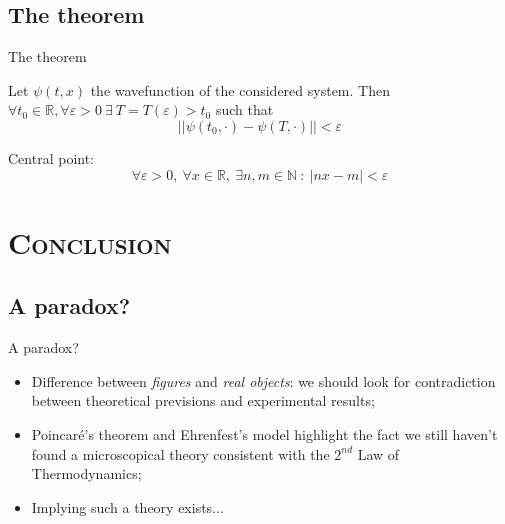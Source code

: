 \documentclass[xcolor=x11names, compress]{beamer}
\renewcommand{\(}{\begin{columns}}
\renewcommand{\)}{\end{columns}}
\newcommand{\<}[1]{\begin{column}{#1}}
\renewcommand{\>}{\end{column}}
\theoremstyle{definition}
\theoremstyle{plain}
\begin{document}
\subsection{The theorem}
\begin{frame}{The theorem}
\large{
\begin{theorem}
Let $\psi(t, x)$ the wavefunction of the considered system.\newline
Then $\forall t_0\in\mathbb R, \forall \varepsilon>0\ \exists\ T=T(\varepsilon)>t_0$ such that
\[
||\psi(t_0,\cdot)-\psi(T,\cdot)||<\varepsilon
\]
\end{theorem}
}
Central point:
\[
\forall \varepsilon > 0,\ \forall x\in\mathbb R,\ \exists n,m\in\mathbb N\ :\ |nx-m|<\varepsilon
\]
\end{frame}

\section{\scshape Conclusion}
\subsection{A paradox?}
\begin{frame}{A paradox?}
\begin{itemize}
\item Difference between \emph{figures} and \emph{real objects}: we should look for contradiction between theoretical previsions and experimental results;
\item Poincar\'e's theorem and Ehrenfest's model highlight the fact we still haven't found a microscopical theory consistent with the $2^{nd}$ Law of Thermodynamics;
\item Implying such a theory exists...
\end{itemize}
\end{frame}

\section{ }
\begin{frame}
\end{frame}
\end{document}
